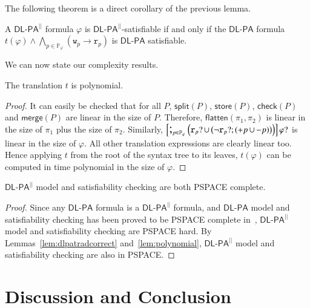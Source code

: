 \documentclass{llncs}
\newcommand{\progStore}{\mathsf{store}}
\newcommand{\progOkChange}{\mathsf{check}}
\newcommand{\progsplit}{\mathsf{split}}
\newcommand{\progmerge}{\mathsf{merge}}
\newcommand{\progFlatten}{\mathsf{flatten}}
\newcommand{\pll}{ {||} }							%
\newcommand{\readable}[1]{\mathtt{r}_{#1}}
\newcommand{\writable}[1]{\mathtt{w}_{#1}}
\newcommand{\testpdl}{?}				%
\newcommand{\Dlpa}{\ensuremath{\mathsf{DL\text{-}PA}}\xspace}
\newcommand{\DlpaPll}{\ensuremath{\mathsf{DL\text{-}PA}^\pll}\xspace}
\newcommand{\assgntopV}[1]{{\mathtt {+} #1}}
\newcommand{\assgnbotV}[1]{{\mathtt {-} #1}}
\newcommand{\limp}{ \rightarrow }
\newcommand{\ndet}{\,{\cup}\,}
\renewcommand{\phi}{\varphi}
\newcommand{\propset}{\mathbb P}
\newcommand{\propsetOf}[1]{\propset_{#1}}
\newcommand{\seqseq}[1]{ \text{\Large ;}_{#1} ~ }
\begin{document}
The following theorem is a direct corollary of the previous lemma.

\begin{theorem}
A \DlpaPll formula $\phi$ is \DlpaPll-satisfiable if and only if the \Dlpa formula
$t(\phi) \land \bigwedge_{p \in \propsetOf \phi } (\writable{p} \limp \readable p)$ 
is \Dlpa satisfiable.
\end{theorem}

We can now state our complexity results.

\begin{lemma}\label{lem:polynomial}
The translation $t$ is polynomial.
\end{lemma}
\begin{proof}
It can easily be checked that for all $P$, $\progsplit(P)$, $\progStore(P)$, $\progOkChange(P)$ and $\progmerge(P)$ are linear in the size of $P$.
Therefore, $\progFlatten(\pi_1, \pi_2)$ is linear in the size of $\pi_1$ plus the size of $\pi_2$.
Similarly, 
$\left[\seqseq{p \in \propsetOf \phi} \Big(
\readable{p} \testpdl \ndet \big( \lnot \readable{p} \testpdl ; (\assgntopV{p} \ndet \assgnbotV{p}) \big) 
\Big)\right] \phi \testpdl $ is linear in the size of $\phi$.
All other translation expressions are clearly linear too.
Hence applying $t$ from the root of the syntax tree to its leaves, $t(\phi)$ can be computed in time polynomial in the size of $\phi$.
\end{proof}

\begin{theorem}
\DlpaPll model and satisfiability checking are both PSPACE complete.
\end{theorem}
\begin{proof}
Since any \Dlpa formula is a \DlpaPll formula, and \Dlpa model and satisfiability checking has been proved to be PSPACE complete in~\cite{BalbianiHST14},
\DlpaPll model and satisfiability checking are PSPACE hard.
By Lemmas~\ref{lem:dlpatradcorrect} and~\ref{lem:polynomial}, \DlpaPll model and satisfiability checking are also in PSPACE.
\end{proof}

\section{Discussion and Conclusion}\label{sec:conclusion}
\end{document}
